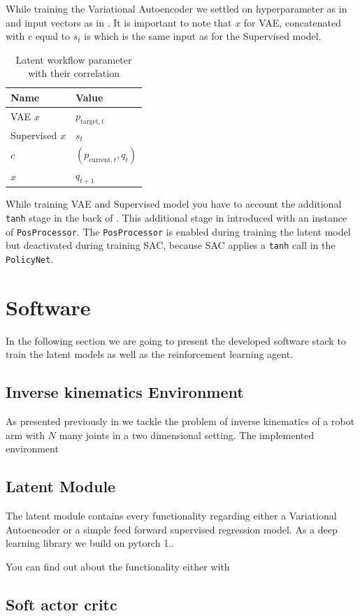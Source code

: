 While training the Variational Autoencoder we settled on hyperparameter as in  and input vectors as in . It is important to note that $x$ for VAE, concatenated with $c$ equal to $s_t$ is which is the same input as for the Supervised model. 
\begin{table}[]
    \centering
    \begin{tabular}{l|l}
        Name & Value \\
        \hline
        VAE $x$ & $p_{\text{target}, t}$ \\
        Supervised $x$ & $s_t$ \\
        $c$ & $(p_{\text{current}, t}, q_t)$ \\
        $\hat{x}$ & $q_{t + 1}$
    \end{tabular}
    \caption[Latent workflow parameter]{Latent workflow parameter with their correlation}
    \label{tab:Latent Parameter}
\end{table}

While training VAE and Supervised model you have to account the additional \texttt{tanh} stage in the back of . This additional stage in introduced with an instance of \texttt{PosProcessor}. The \texttt{PosProcessor} is enabled during training the latent model but deactivated during training SAC, because SAC applies a \texttt{tanh} call in the \texttt{PolicyNet}. 

\section{Software}

In the following section we are going to present the developed software stack to train the latent models as well as the reinforcement learning agent.

\subsection{Inverse kinematics Environment}

As presented previously in  we tackle the problem of inverse kinematics of a robot arm with $N$ many joints in a two dimensional setting. 
The implemented environment

\subsection{Latent Module}

The latent module contains every functionality regarding either a Variational Autoencoder or a simple feed forward supervised regression model.
As a deep learning library we build on pytorch 1.. 

You can find out about the functionality either with 



\subsection{Soft actor critc}

